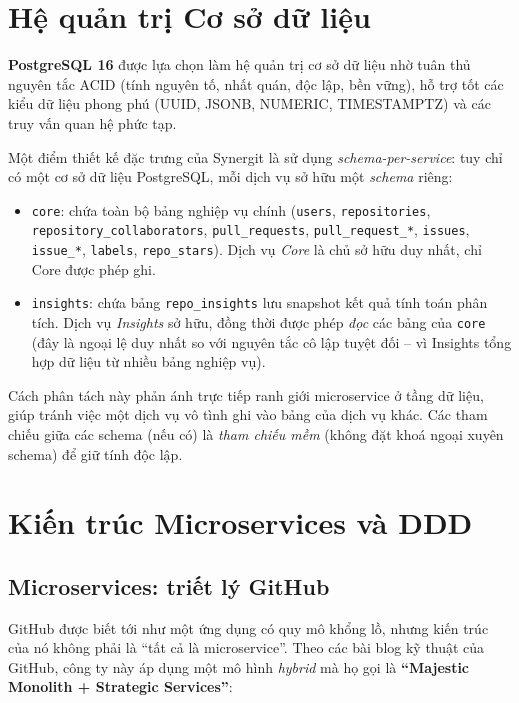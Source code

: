 \section{Hệ quản trị Cơ sở dữ liệu}
\textbf{PostgreSQL 16} được lựa chọn làm hệ quản trị cơ sở dữ liệu nhờ tuân thủ nguyên tắc ACID (tính nguyên tố, nhất quán, độc lập, bền vững), hỗ trợ tốt các kiểu dữ liệu phong phú (UUID, JSONB, NUMERIC, TIMESTAMPTZ) và các truy vấn quan hệ phức tạp.

Một điểm thiết kế đặc trưng của Synergit là sử dụng \textit{schema-per-service}: tuy chỉ có một cơ sở dữ liệu PostgreSQL, mỗi dịch vụ sở hữu một \textit{schema} riêng:
\begin{itemize}
\item \texttt{core}: chứa toàn bộ bảng nghiệp vụ chính (\texttt{users}, \texttt{repositories}, \texttt{repository\_collaborators}, \texttt{pull\_requests}, \texttt{pull\_request\_*}, \texttt{issues}, \texttt{issue\_*}, \texttt{labels}, \texttt{repo\_stars}). Dịch vụ \textit{Core} là chủ sở hữu duy nhất, chỉ Core được phép ghi.
\item \texttt{insights}: chứa bảng \texttt{repo\_insights} lưu snapshot kết quả tính toán phân tích. Dịch vụ \textit{Insights} sở hữu, đồng thời được phép \textit{đọc} các bảng của \texttt{core} (đây là ngoại lệ duy nhất so với nguyên tắc cô lập tuyệt đối -- vì Insights tổng hợp dữ liệu từ nhiều bảng nghiệp vụ).
\end{itemize}

Cách phân tách này phản ánh trực tiếp ranh giới microservice ở tầng dữ liệu, giúp tránh việc một dịch vụ vô tình ghi vào bảng của dịch vụ khác. Các tham chiếu giữa các schema (nếu có) là \textit{tham chiếu mềm} (không đặt khoá ngoại xuyên schema) để giữ tính độc lập.

\section{Kiến trúc Microservices và DDD}

\subsection{Microservices: triết lý GitHub}
GitHub được biết tới như một ứng dụng có quy mô khổng lồ, nhưng kiến trúc của nó không phải là ``tất cả là microservice''. Theo các bài blog kỹ thuật của GitHub, công ty này áp dụng một mô hình \textit{hybrid} mà họ gọi là \textbf{``Majestic Monolith + Strategic Services''}:

